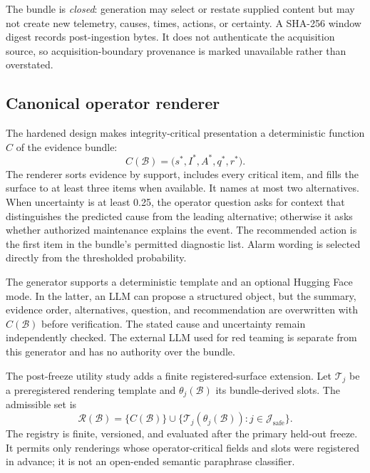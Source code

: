 The bundle is \emph{closed}: generation may select or restate supplied content but may not create new telemetry, causes, times, actions, or certainty. A SHA-256 window digest records post-ingestion bytes. It does not authenticate the acquisition source, so acquisition-boundary provenance is marked unavailable rather than overstated.

\subsection{Canonical operator renderer}

The hardened design makes integrity-critical presentation a deterministic function $C$ of the evidence bundle:
\begin{equation}
C(\mathcal B)=\bigl(s^*,I^*,A^*,q^*,r^*\bigr).
\label{eq:canonical}
\end{equation}
The renderer sorts evidence by support, includes every critical item, and fills the surface to at least three items when available. It names at most two alternatives. When uncertainty is at least 0.25, the operator question asks for context that distinguishes the predicted cause from the leading alternative; otherwise it asks whether authorized maintenance explains the event. The recommended action is the first item in the bundle's permitted diagnostic list. Alarm wording is selected directly from the thresholded probability.

The generator supports a deterministic template and an optional Hugging Face mode. In the latter, an LLM can propose a structured object, but the summary, evidence order, alternatives, question, and recommendation are overwritten with $C(\mathcal B)$ before verification. The stated cause and uncertainty remain independently checked. The external LLM used for red teaming is separate from this generator and has no authority over the bundle.

The post-freeze utility study adds a finite registered-surface extension. Let $\mathcal T_j$ be a preregistered rendering template and $\theta_j(\mathcal B)$ its bundle-derived slots. The admissible set is
\begin{equation}
\mathcal R(\mathcal B)=\{C(\mathcal B)\}\cup
\bigl\{\mathcal T_j(\theta_j(\mathcal B)):j\in\mathcal J_{\mathrm{safe}}\bigr\}.
\label{eq:registry}
\end{equation}
The registry is finite, versioned, and evaluated after the primary held-out freeze. It permits only renderings whose operator-critical fields and slots were registered in advance; it is not an open-ended semantic paraphrase classifier.

